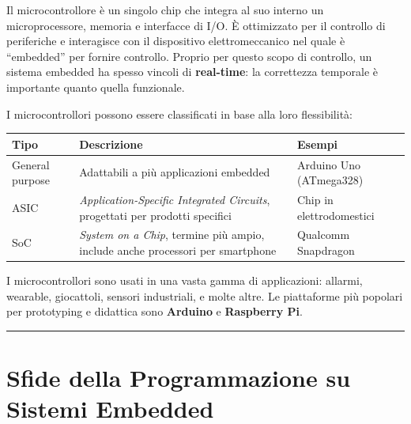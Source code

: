 \documentclass[
  italian,
  openany]{book}
\newcounter{none} %
\begin{document}
Il microcontrollore è un singolo chip che integra al suo interno un
microprocessore, memoria e interfacce di I/O. È ottimizzato per il
controllo di periferiche e interagisce con il dispositivo
elettromeccanico nel quale è ``embedded'' per fornire controllo. Proprio
per questo scopo di controllo, un sistema embedded ha spesso vincoli di
\textbf{real-time}: la correttezza temporale è importante quanto quella
funzionale.

I microcontrollori possono essere classificati in base alla loro
flessibilità:

{\def\LTcaptype{none} %
\begin{longtable}[]{@{}
  >{\raggedright\arraybackslash}p{}
  >{\raggedright\arraybackslash}p{}
  >{\raggedright\arraybackslash}p{}@{}}
\toprule\noalign{}
\begin{minipage}[b]{\linewidth}\raggedright
Tipo
\end{minipage} & \begin{minipage}[b]{\linewidth}\raggedright
Descrizione
\end{minipage} & \begin{minipage}[b]{\linewidth}\raggedright
Esempi
\end{minipage} \\
\midrule\noalign{}
\endhead
\bottomrule\noalign{}
\endlastfoot
General purpose & Adattabili a più applicazioni embedded & Arduino Uno
(ATmega328) \\
ASIC & \emph{Application-Specific Integrated Circuits}, progettati per
prodotti specifici & Chip in elettrodomestici \\
SoC & \emph{System on a Chip}, termine più ampio, include anche
processori per smartphone & Qualcomm Snapdragon \\
\end{longtable}
}

I microcontrollori sono usati in una vasta gamma di applicazioni:
allarmi, wearable, giocattoli, sensori industriali, e molte altre. Le
piattaforme più popolari per prototyping e didattica sono
\textbf{Arduino} e \textbf{Raspberry Pi}.

\begin{center}\rule{0.5\linewidth}{0.5pt}\end{center}

\section{Sfide della Programmazione su Sistemi
Embedded}\label{sfide-della-programmazione-su-sistemi-embedded}
\end{document}
